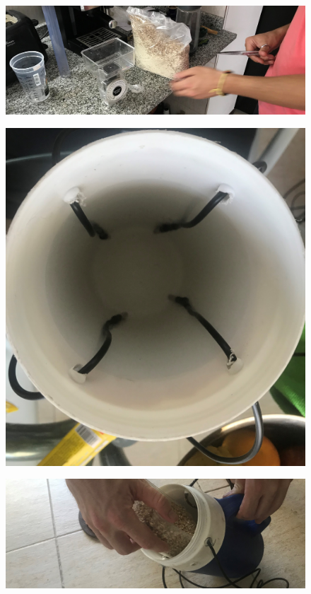     \begin{figure}
        \centering
        \includegraphics[scale=0.10]{Anexo/FotosExperimentos/P2.jpg}
        \label{fig:FragInsumos}
    \end{figure}
        
    \begin{figure}
        \centering
        \includegraphics[scale=0.10]{Anexo/FotosExperimentos/P3.jpg}
        \label{fig:ConstrucMacerador}
    \end{figure}
    
    \begin{figure}
        \centering
        \includegraphics[scale=0.10]{Anexo/FotosExperimentos/P4.jpg}
        \label{fig:IncorpInsumos}
    \end{figure}
    
